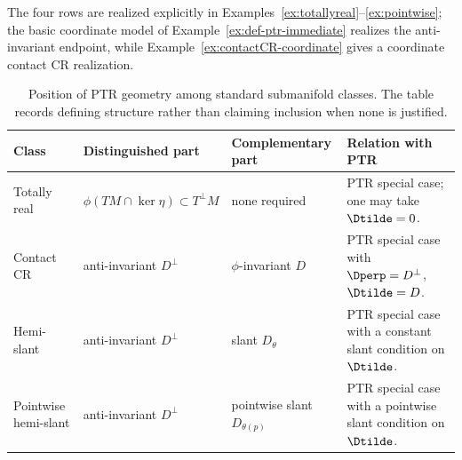 \documentclass[11pt]{article}
\theoremstyle{definition}\newtheorem{definition}[theorem]{Definition}\newtheorem{example}[theorem]{Example}
\theoremstyle{remark}\newtheorem{remark}[theorem]{Remark}
\begin{document}
The four rows are realized explicitly in
Examples~\ref{ex:totallyreal}--\ref{ex:pointwise}; the basic coordinate
model of Example~\ref{ex:def-ptr-immediate} realizes the anti-invariant
endpoint, while Example~\ref{ex:contactCR-coordinate} gives a coordinate
contact CR realization.


\begin{table}[htbp]
\centering
\small
\caption{Position of PTR geometry among standard submanifold classes. The table records defining structure rather than claiming inclusion when none is justified.}
\label{tab:comparison}
\begin{tabularx}{\textwidth}{@{}>{\raggedright\arraybackslash}p{2.45cm}>{\raggedright\arraybackslash}X>{\raggedright\arraybackslash}X>{\raggedright\arraybackslash}X@{}}
\toprule
Class & Distinguished part & Complementary part & Relation with PTR \\
\midrule
Totally real & $\phi(TM\cap\ker\eta)\subset T^\perp M$ & none required & PTR special case; one may take $\Dtilde=0$. \\
Contact CR & anti-invariant $D^\perp$ & $\phi$-invariant $D$ & PTR special case with $\Dperp=D^\perp$, $\Dtilde=D$. \\
Hemi-slant & anti-invariant $D^\perp$ & slant $D_\theta$ & PTR special case with a constant slant condition on $\Dtilde$. \\
Pointwise hemi-slant & anti-invariant $D^\perp$ & pointwise slant $D_{\theta(p)}$ & PTR special case with a pointwise slant condition on $\Dtilde$. \\


\end{tabularx}
\end{table}
\end{document}
